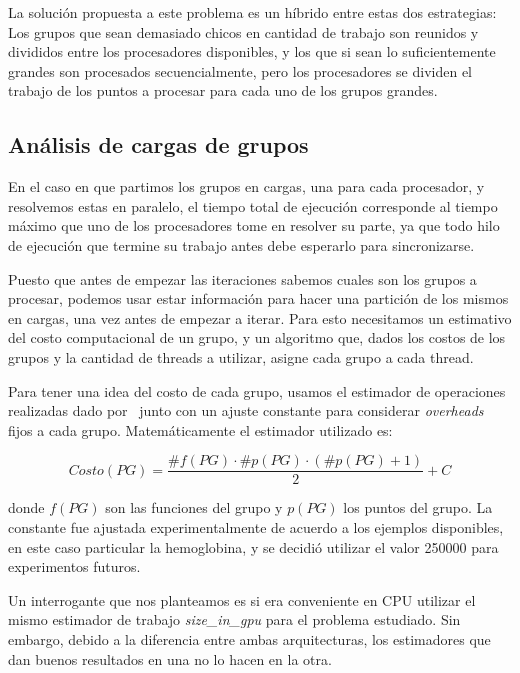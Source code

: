 La soluci\'on propuesta a este problema es un h\'ibrido entre estas dos
estrategias: Los grupos que sean demasiado chicos en cantidad de trabajo son
reunidos y divididos entre los procesadores disponibles, y los que si sean lo
suficientemente grandes son procesados secuencialmente, pero los procesadores se
dividen el trabajo de los puntos a procesar para cada uno de los grupos grandes.

\subsection{An\'alisis de cargas de grupos}
\label{PredictorCPU}

En el caso en que partimos los grupos en cargas, una para cada procesador, y
resolvemos estas en paralelo, el tiempo total de ejecuci\'on corresponde al tiempo m\'aximo
que uno de los procesadores tome en resolver su parte, ya que todo hilo de
ejecuci\'on que termine su trabajo antes debe esperarlo para sincronizarse.

Puesto que antes de empezar las iteraciones sabemos cuales son los grupos a
procesar, podemos usar estar informaci\'on para hacer una partici\'on de los mismos
en cargas, una vez antes de empezar a iterar. Para esto necesitamos un estimativo del costo
computacional de un grupo, y un algoritmo que, dados los costos de los grupos y la cantidad de threads a
utilizar, asigne cada grupo a cada thread.

Para tener una idea del costo de cada grupo, usamos el estimador de operaciones realizadas
dado por~\cite{LIO} junto con un ajuste constante para considerar \textit{overheads} fijos a
cada grupo. Matem\'aticamente el estimador utilizado es:

\begin{equation}
    Costo(PG) = \frac{\#f(PG) \cdot \#p(PG) \cdot (\#p(PG) + 1)}{2} + C
\end{equation}

donde $f(PG)$ son las funciones del grupo y $p(PG)$ los puntos del grupo. La
constante fue ajustada experimentalmente de acuerdo a los ejemplos disponibles,
en este caso particular la hemoglobina, y se decidi\'o utilizar el valor 250000
para experimentos futuros.

Un interrogante que nos planteamos es si era conveniente en CPU utilizar el mismo
estimador de trabajo \textit{size\_in\_gpu} para el problema estudiado. Sin
embargo, debido a la diferencia entre ambas arquitecturas, los estimadores que
dan buenos resultados en una no lo hacen en la otra.

